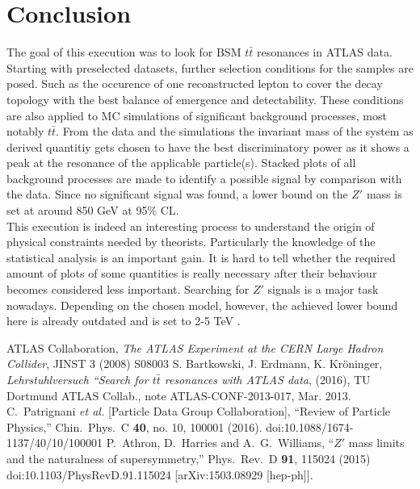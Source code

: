\section{Conclusion}
The goal of this execution was to look for BSM $t\bar t$ resonances in ATLAS data. Starting with preselected datasets, further selection conditions 
for the samples are posed. Such as the occurence of one reconstructed lepton to cover the decay topology with the best balance of emergence and
detectability. These conditions are also applied to MC simulations of significant background processes, most notably $t\bar t$. From the data and
the simulations the invariant mass of the system as derived quantitiy gets chosen to have the best discriminatory power as it shows a peak at 
the resonance of the applicable particle(s). Stacked plots of all background processes are made to identify a possible signal by comparison with
the data. Since no significant signal was found, a lower bound on the $Z'$ mass is set at around 850 GeV at 95\% CL.\\
\noindent This execution is indeed an interesting process to understand the origin of physical constraints needed by theorists. Particularly the 
knowledge of the statistical analysis is an important gain. It is hard to tell whether the required amount of plots of some quantities is really 
necessary after their behaviour becomes considered less important. Searching for $Z'$ signals is a major task nowadays. Depending on the chosen
model, however, the achieved lower bound here is already outdated and is set to 2-5 TeV \cite{Atlaslimits}\cite{pdg}\cite{1503.08929}.

\newpage
 \begin{thebibliography}{WissOnl}
  ATLAS Collaboration, \textit{The ATLAS Experiment at the CERN Large Hadron Collider}, JINST 3 (2008) S08003
  S. Bartkowski, J. Erdmann, K. Kröninger, \textit{Lehrstuhlversuch ``Search for $t\bar t$ resonances with ATLAS data}, (2016), TU Dortmund
  ATLAS Collab., note ATLAS-CONF-2013-017, Mar. 2013.
    C.~Patrignani {\it et al.} [Particle Data Group Collaboration],
 ``Review of Particle Physics,''
  Chin.\ Phys.\ C {\bf 40}, no. 10, 100001 (2016).
  doi:10.1088/1674-1137/40/10/100001
   P.~Athron, D.~Harries and A.~G.~Williams,
  ``$Z'$ mass limits and the naturalness of supersymmetry,''
  Phys.\ Rev.\ D {\bf 91}, 115024 (2015)
  doi:10.1103/PhysRevD.91.115024
  [arXiv:1503.08929 [hep-ph]].
 \end{thebibliography}




